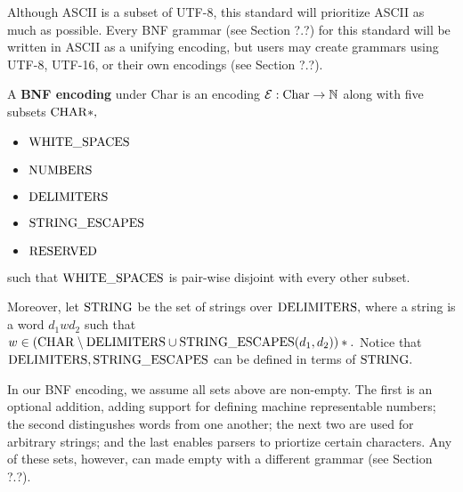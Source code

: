 
Although ASCII is a subset of UTF-8, this standard will prioritize ASCII as much as possible. Every BNF grammar (see Section ?.?) for this standard will be written in ASCII as a unifying encoding, but users may create grammars using UTF-8, UTF-16, or their own encodings (see Section ?.?).


\begin{definition}
  A \textbf{BNF encoding} under Char is an encoding $\mathcal{E}: \textrm{Char} \to \mathbb{N}$ along with five subsets $\mathrm{CHAR}*,$
  \begin{itemize}
  \item $\mathrm{WHITE\_SPACES}$
  \item $\mathrm{NUMBERS}$
  \item $\mathrm{DELIMITERS}$
  \item $\mathrm{STRING\_ESCAPES}$
  \item $\mathrm{RESERVED}$
  \end{itemize}
  such that $\mathrm{WHITE\_SPACES}$ is pair-wise disjoint with every other subset.

Moreover, let $\mathrm{STRING}$ be the set of strings over $\mathrm{DELIMITERS},$ where a string is a word $d_{1}wd_{2}$ such that $w \in (\mathrm{CHAR} \setminus \mathrm{DELIMITERS} \cup \mathrm{STRING\_ESCAPES}(d_{1}, d_{2}))*.$ Notice that $\mathrm{DELIMITERS}, \mathrm{STRING\_ESCAPES}$ can be defined in terms of $\mathrm{STRING}.$
\end{definition}
In our BNF encoding, we assume all sets above are non-empty. The first is an optional addition, adding support for defining machine representable numbers; the second distingushes words from one another; the next two are used for arbitrary strings; and the last enables parsers to priortize certain characters. Any of these sets, however, can made empty with a different grammar (see Section ?.?).




